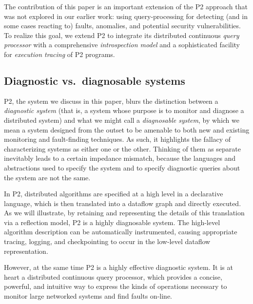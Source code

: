 \documentclass{sig-alt-full}
\def\Sys{P2\xspace}
\begin{document}
The contribution of this paper is an important extension
of the \Sys approach that was not explored in our earlier work:
using query-processing for
detecting (and in some cases reacting to) faults, anomalies, and
potential security vulnerabilities.  To realize this goal, we extend
\Sys to integrate its distributed continuous \emph{query processor} with
 a comprehensive
\emph{introspection model} and a sophisticated facility for \emph{execution
tracing} of \Sys programs. 


\subsection{Diagnostic vs.\ diagnosable systems}

\Sys, the system we discuss in this paper, blurs the distinction
between a \emph{diagnostic system} (that is, a system whose purpose is to
monitor and diagnose a distributed system) and what we might call a
\emph{diagnosable system}, by which we mean a system designed from the
outset to be amenable to both new and existing monitoring and
fault-finding techniques.  As such, it highlights the fallacy of
characterizing systems as either one or the other.  Thinking of them
as separate inevitably leads to a certain impedance mismatch, because
the languages and abstractions used to specify the system and to
specify diagnostic queries about the system are not the same.

In \Sys, distributed algorithms are specified at a high level in a
declarative language, which is then translated into a dataflow graph
and directly executed.  As we will illustrate, by retaining and
representing the details of this translation via a reflection model,
\Sys is a highly diagnosable system.  The
high-level algorithm description can be automatically instrumented, causing
appropriate tracing, logging, and checkpointing to occur in the
low-level dataflow representation.

However, at the same time \Sys is a highly effective diagnostic
system.  It is at heart a distributed continuous query processor, which
provides a concise, powerful, and intuitive way to express the kinds
of operations necessary to monitor large networked systems and 
find faults on-line.
\end{document}
